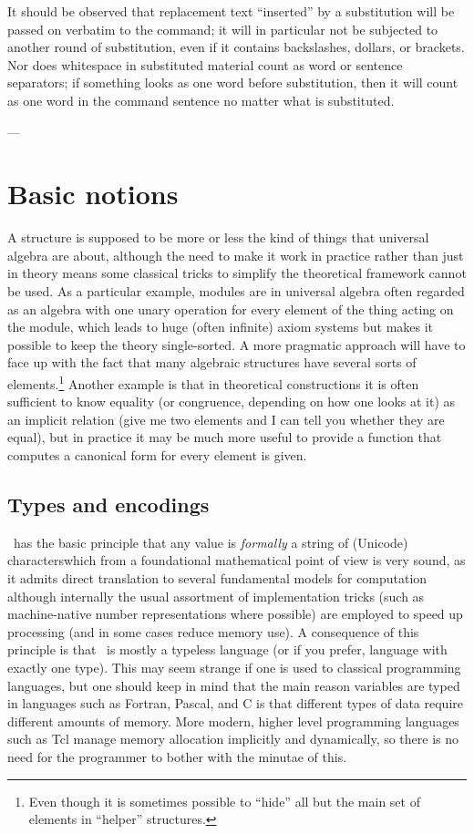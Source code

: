 \documentclass{mtmtcl}
\theoremstyle{plain}
\theoremstyle{remark}
\begin{document}
It should be observed that replacement text ``inserted'' by a 
substitution will be passed on verbatim to the command; it will in 
particular not be subjected to another round of substitution, even if 
it contains backslashes, dollars, or brackets. Nor does whitespace in 
substituted material count as word or sentence separators; if 
something looks as one word before substitution, then it will 
count as one word in the command sentence no matter what is 
substituted.





---


\section{Basic notions}

A structure is supposed to be more or less the kind of things that 
universal algebra are about, although the need to make it work in 
practice rather than just in theory means some classical tricks to 
simplify the theoretical framework cannot be used. As a particular 
example, modules are in universal algebra often regarded as an 
algebra with one unary operation for every element of the thing 
acting on the module, which leads to huge (often infinite) axiom 
systems but makes it possible to keep the theory single-sorted. A 
more pragmatic approach will have to face up with the fact that many 
algebraic structures have several sorts of elements.\footnote{\relax
  Even though it is sometimes possible to ``hide'' all but the main 
  set of elements in ``helper'' structures.
} Another example is that in theoretical constructions it is often 
sufficient to know equality (or congruence, depending on how one 
looks at it) as an implicit relation (give me two elements and I can 
tell you whether they are equal), but in practice it may be much 
more useful to provide a function that computes a canonical form 
for every element is given.


\subsection{Types and encodings}

\Tcl\ has the basic principle that any value is 
\emph{formally} a string of (Unicode) characters\Ldash which from a 
foundational mathematical point of view is very sound, as it admits 
direct translation to several fundamental models for computation\Dash 
although internally the usual assortment of implementation tricks 
(such as machine-native number representations where possible) are 
employed to speed up processing (and in some cases reduce memory use). 
A consequence of this principle is that \Tcl\ is mostly a typeless 
language (or if you prefer, language with exactly one type). This may 
seem strange if one is used to classical programming languages, but 
one should keep in mind that the main reason variables are typed in 
languages such as Fortran, Pascal, and C is that different types of 
data require different amounts of memory. More modern, higher level 
programming languages such as Tcl manage memory allocation implicitly 
and dynamically, so there is no need for the programmer to bother 
with the minutae of this.
\end{document}
